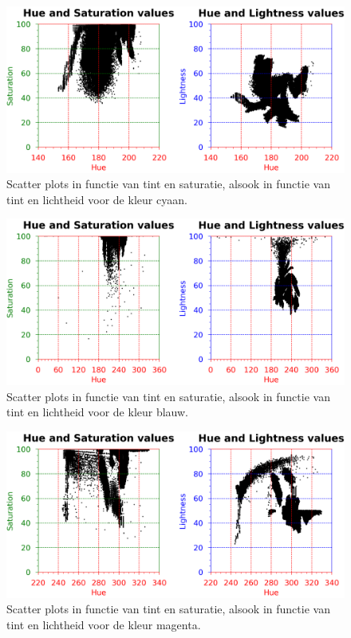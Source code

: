 \begin{figure}[h!]
	\center
	\includegraphics[width=\textwidth]{img/hslBlueGreen.png}
	\caption{Scatter plots in functie van tint en saturatie, alsook in functie van tint en lichtheid voor de kleur cyaan.}
	\label{hslBlueGreenPlot}
\end{figure}

\begin{figure}[h!]
	\center
	\includegraphics[width=\textwidth]{img/hslBlue.png}
	\caption{Scatter plots in functie van tint en saturatie, alsook in functie van tint en lichtheid voor de kleur blauw.}
	\label{hslBluePlot}
\end{figure}

\begin{figure}[h!]
	\center
	\includegraphics[width=\textwidth]{img/hslPink.png}
	\caption{Scatter plots in functie van tint en saturatie, alsook in functie van tint en lichtheid voor de kleur magenta.}
	\label{hslPinkPlot}
\end{figure}

